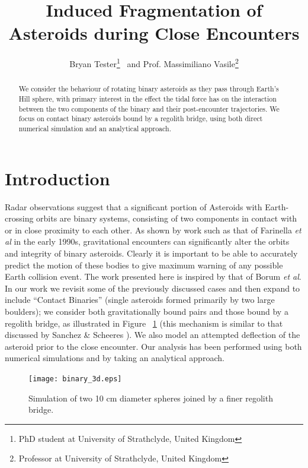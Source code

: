\documentclass[letterpaper, preprint, paper,11pt]{AAS}	%
\begin{document}
\title{\textsf{\textbf{Induced Fragmentation of Asteroids during Close Encounters}}}
\author{\textsf{Bryan Tester}\thanks{PhD student at University of Strathclyde, United Kingdom}
\ and \textsf{Prof. Massimiliano Vasile}\thanks{Professor at University of Strathclyde, United Kingdom}}

\maketitle{} 		


\begin{abstract}
We consider the behaviour of rotating binary asteroids as they pass through Earth's Hill sphere, with primary interest in the effect the tidal force has on the interaction between the two components of the binary and their post-encounter trajectories. We focus on contact binary asteroids bound by a regolith bridge, using both direct numerical simulation and an analytical approach.
\end{abstract}

\section{Introduction}
Radar observations suggest that a significant portion of Asteroids with Earth-crossing orbits are binary systems, consisting of two components in contact with or in close proximity to each other. As shown by work such as that of Farinella \textit{et al} \cite{binaryevo} in the early 1990s, gravitational encounters can significantly alter the orbits and integrity of binary asteroids. Clearly it is important to be able to accurately predict the motion of these bodies to give maximum warning of any possible Earth collision event. The work presented here is inspired by that of Borum \textit{et al}\cite{exchange}. In our work we revisit some of the previously discussed cases and then expand to include “Contact Binaries” (single asteroids formed primarily by two large boulders); we consider both gravitationally bound pairs and those bound by a regolith bridge, as illustrated in Figure ~\ref{fig:Pic} (this mechanism is similar to that discussed by Sanchez \& Scheeres \cite{dustbound}). We also model an attempted deflection of the asteroid prior to the close encounter. Our analysis has been performed using both numerical simulations and by taking an analytical approach.
\begin{figure}[H]
\centering
\texttt{[image: binary\_3d.eps]} 
\caption{Simulation of two 10 cm diameter spheres joined by a finer regolith bridge.} 
\label{fig:Pic}
\end{figure} 
\end{document}
